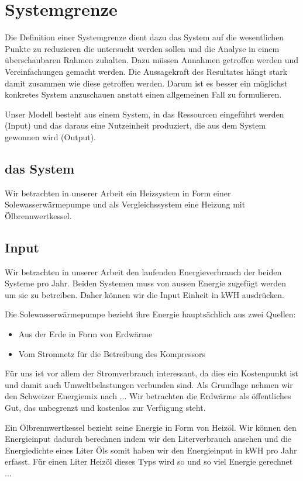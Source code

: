 \chapter{Systemgrenze}
\label{chap:Systemgrenze}

Die Definition einer Systemgrenze dient dazu das System auf die wesentlichen
Punkte zu reduzieren die untersucht werden sollen und die Analyse in einem
überschaubaren Rahmen zuhalten.
Dazu müssen Annahmen getroffen werden und Vereinfachungen gemacht werden.
Die Aussagekraft des Resultates hängt stark damit zusammen wie diese getroffen
werden. Darum ist es besser ein möglichst konkretes System anzuschauen anstatt
einen allgemeinen Fall zu formulieren.

Unser Modell besteht aus einem System, in das Ressourcen eingeführt werden
(Input) und das daraus eine Nutzeinheit produziert, die aus dem System gewonnen
wird (Output).

\section{das System}

Wir betrachten in unserer Arbeit ein Heizsystem in Form einer
Solewasserwärmepumpe und als Vergleichssystem eine Heizung mit
Ölbrennwertkessel.

\section{Input}

Wir betrachten in unserer Arbeit den laufenden Energieverbrauch der beiden
Systeme pro Jahr.
Beiden Systemen muss von aussen Energie zugefügt werden um sie zu betreiben.
Daher können wir die Input Einheit in kWH ausdrücken.

Die Solewasserwärmepumpe bezieht ihre Energie hauptsächlich aus zwei Quellen:
\begin{itemize}
\item Aus der Erde in Form von Erdwärme
\item Vom Stromnetz für die Betreibung des Kompressors
\end{itemize}

Für uns ist vor allem der Stromverbrauch interessant, da dies ein Kostenpunkt
ist und damit auch Umweltbelastungen verbunden sind.
Als Grundlage nehmen wir den Schweizer Energiemix nach ...
Wir betrachten die Erdwärme als öffentliches Gut, das unbegrenzt und kostenlos
zur Verfügung steht.

Ein Ölbrennwertkessel bezieht seine Energie in Form von Heizöl.
Wir können den Energieinput dadurch berechnen indem wir den Literverbrauch
ansehen und die Energiedichte eines Liter Öls somit haben wir den
Energieinput in kWH pro Jahr erfasst.
Für einen Liter Heizöl dieses Typs wird so und so viel Energie gerechnet ...

